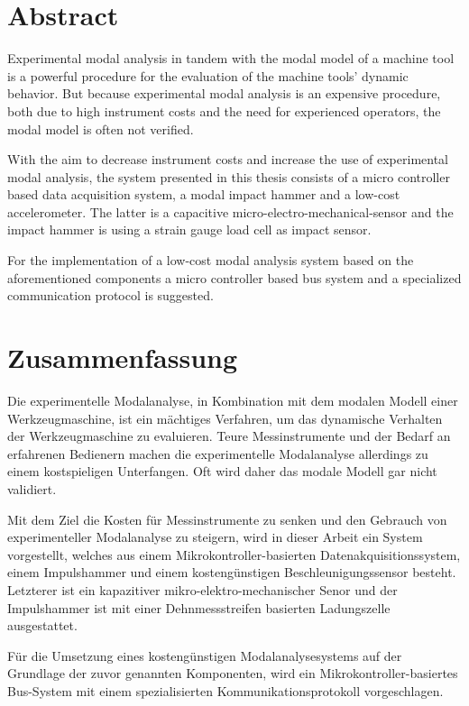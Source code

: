 \chapter*{Abstract}

Experimental modal analysis in tandem with the modal model of a machine tool is a powerful procedure for the evaluation of the machine tools' dynamic behavior. But because experimental modal analysis is an expensive procedure, both due to high instrument costs and the need for experienced operators, the modal model is often not verified.

With the aim to decrease instrument costs and increase the use of experimental modal analysis, the system presented in this thesis consists of a micro controller based data acquisition system, a modal impact hammer and a low-cost accelerometer. The latter is a capacitive micro-electro-mechanical-sensor and the impact hammer is using a strain gauge load cell as impact sensor.

For the implementation of a low-cost modal analysis system based on the aforementioned components a micro controller based bus system and a specialized communication protocol is suggested.

\cleardoublepage{}
\chapter*{Zusammenfassung}

Die experimentelle Modalanalyse, in Kombination mit dem modalen Modell einer Werkzeugmaschine, ist ein mächtiges Verfahren, um das dynamische Verhalten der Werkzeugmaschine zu evaluieren. Teure Messinstrumente und der Bedarf an erfahrenen Bedienern machen die experimentelle Modalanalyse allerdings zu einem kostspieligen Unterfangen. Oft wird daher das modale Modell gar nicht validiert.

Mit dem Ziel die Kosten für Messinstrumente zu senken und den Gebrauch von experimenteller Modalanalyse zu steigern, wird in dieser Arbeit ein System vorgestellt, welches aus einem Mikrokontroller-basierten Datenakquisitionssystem, einem Impulshammer und einem kostengünstigen Beschleunigungssensor besteht. Letzterer ist ein kapazitiver mikro-elektro-mechanischer Senor und der Impulshammer ist mit einer Dehnmessstreifen basierten Ladungszelle ausgestattet.

Für die Umsetzung eines kostengünstigen Modalanalysesystems auf der Grundlage der zuvor genannten Komponenten, wird ein Mikrokontroller-basiertes Bus-System mit einem spezialisierten Kommunikationsprotokoll vorgeschlagen.
